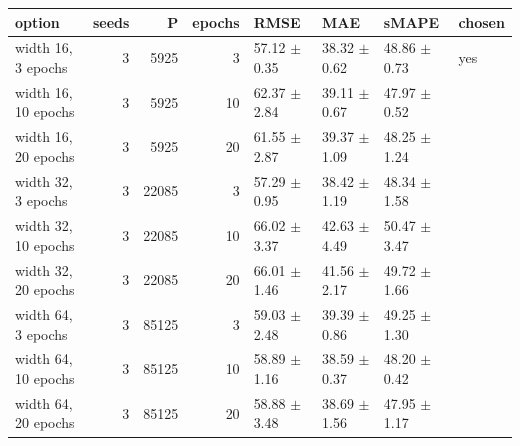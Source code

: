 \begin{tabular}{lrrrllll}
\toprule
option & seeds & P & epochs & RMSE & MAE & sMAPE & chosen \\
\midrule
width 16, 3 epochs & 3 & 5925 & 3 & 57.12 $\pm$ 0.35 & 38.32 $\pm$ 0.62 & 48.86 $\pm$ 0.73 & yes \\
width 16, 10 epochs & 3 & 5925 & 10 & 62.37 $\pm$ 2.84 & 39.11 $\pm$ 0.67 & 47.97 $\pm$ 0.52 &  \\
width 16, 20 epochs & 3 & 5925 & 20 & 61.55 $\pm$ 2.87 & 39.37 $\pm$ 1.09 & 48.25 $\pm$ 1.24 &  \\
width 32, 3 epochs & 3 & 22085 & 3 & 57.29 $\pm$ 0.95 & 38.42 $\pm$ 1.19 & 48.34 $\pm$ 1.58 &  \\
width 32, 10 epochs & 3 & 22085 & 10 & 66.02 $\pm$ 3.37 & 42.63 $\pm$ 4.49 & 50.47 $\pm$ 3.47 &  \\
width 32, 20 epochs & 3 & 22085 & 20 & 66.01 $\pm$ 1.46 & 41.56 $\pm$ 2.17 & 49.72 $\pm$ 1.66 &  \\
width 64, 3 epochs & 3 & 85125 & 3 & 59.03 $\pm$ 2.48 & 39.39 $\pm$ 0.86 & 49.25 $\pm$ 1.30 &  \\
width 64, 10 epochs & 3 & 85125 & 10 & 58.89 $\pm$ 1.16 & 38.59 $\pm$ 0.37 & 48.20 $\pm$ 0.42 &  \\
width 64, 20 epochs & 3 & 85125 & 20 & 58.88 $\pm$ 3.48 & 38.69 $\pm$ 1.56 & 47.95 $\pm$ 1.17 &  \\
\bottomrule
\end{tabular}
